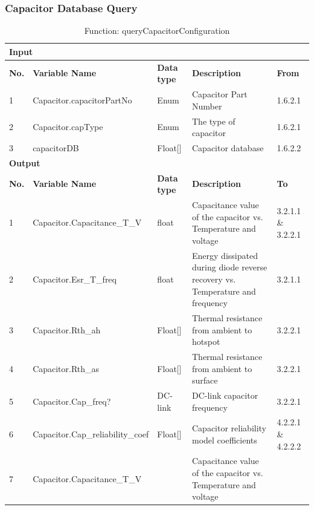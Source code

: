 \documentclass{article}
\begin{document}
\subsubsection{Capacitor Database Query}
\begin{table}[h]
\centering
\caption{Function: queryCapacitorConfiguration}
\begin{tabular}{|l|p{3cm}|l|p{6cm}|p{2cm}|}
\hline
\multicolumn{5}{|l|}{\textbf{Input}} \\ \hline
\textbf{No.} & \textbf{Variable Name} & \textbf{Data type} & \textbf{Description} & \textbf{From} \\ \hline
1 & Capacitor.capacitorPartNo & Enum & Capacitor Part Number & 1.6.2.1 \\ \hline
2 & Capacitor.capType & Enum & The type of capacitor & 1.6.2.1 \\ \hline
3 & capacitorDB & Float[] & Capacitor database & 1.6.2.2 \\ \hline
\multicolumn{5}{|l|}{\textbf{Output}} \\ \hline
\textbf{No.} & \textbf{Variable Name} & \textbf{Data type} & \textbf{Description} & \textbf{To} \\ \hline
1 & Capacitor.Capacitance\_T\_V & float & Capacitance value of the capacitor vs. Temperature and voltage & 3.2.1.1 \& 3.2.2.1 \\ \hline
2 & Capacitor.Esr\_T\_freq & float & Energy dissipated during diode reverse recovery vs. Temperature and frequency & 3.2.1.1 \\ \hline
3 & Capacitor.Rth\_ah & Float[] & Thermal resistance from ambient to hotspot & 3.2.2.1 \\ \hline
4 & Capacitor.Rth\_as & Float[] & Thermal resistance from ambient to surface & 3.2.2.1 \\ \hline
5 & Capacitor.Cap\_freq? & DC-link & DC-link capacitor frequency & 3.2.2.1 \\ \hline
6 & Capacitor.Cap\_reliability\_coef & Float[] & Capacitor reliability model coefficients & 4.2.2.1 \& 4.2.2.2 \\ \hline
7 & Capacitor.Capacitance\_T\_V & & Capacitance value of the capacitor vs. Temperature and voltage & \\ \hline
\end{tabular}
\end{table}
\end{document}
